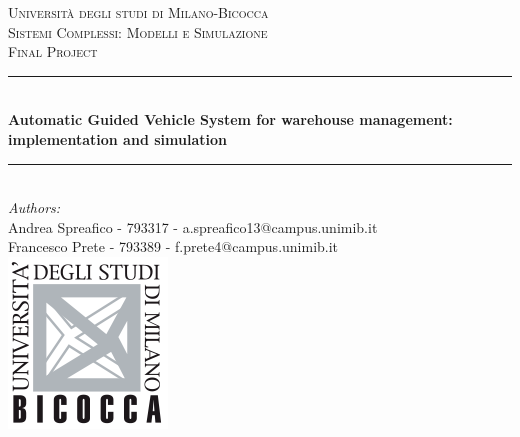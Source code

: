 \documentclass[12pt]{article}
\begin{document}
\begin{titlepage}

\newcommand{\HRule}{\rule{\linewidth}{0.5mm}} %


\center %
 

\textsc{\LARGE Università degli studi di Milano-Bicocca}\\[1cm] %
\textsc{\Large Sistemi Complessi: Modelli e Simulazione}\\[0.3cm] %
\textsc{\large Final Project}\\[0.1cm] %


\HRule \\[0.4cm]
{ \LARGE \bfseries Automatic Guided Vehicle System for warehouse management: implementation and simulation}\\[0.4cm] %
\HRule \\[1.5cm]
 

\large
\emph{Authors:}\\
Andrea Spreafico - 793317 - a.spreafico13@campus.unimib.it \\   %
Francesco Prete - 793389 - f.prete4@campus.unimib.it   \\[2cm] %


\includegraphics{logo.png}\\[1cm] %
 

\end{titlepage}
\end{document}

